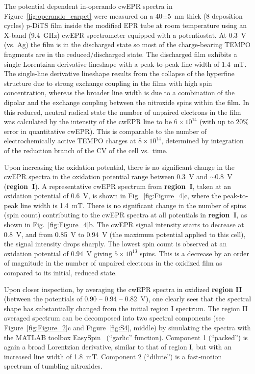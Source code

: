 The potential dependent in-operando cwEPR spectra in Figure~\ref{fig:operando_carpet} were measured on a 40$\pm$5~nm thick (8 deposition cycles) p-DiTS film inside the modified EPR tube at room temperature using an X-band (9.4~GHz) cwEPR spectrometer equipped with a potentiostat. At 0.3~V (vs. Ag) the film is in the discharged state so most of the charge-bearing TEMPO fragments are in the reduced/discharged state. The discharged film exhibits a single Lorentzian derivative lineshape with a peak-to-peak line width of 1.4~mT. The single-line derivative lineshape results from the collapse of the hyperfine structure due to strong exchange coupling in the films with high spin concentration, whereas the broader line width is due to a combination of the dipolar and the exchange coupling between the nitroxide spins within the film. In this reduced, neutral radical state the number of unpaired electrons in the film was calculated by the intensity of the cwEPR line to be $6\times10^{14}$ (with up to 20\% error in quantitative cwEPR). This is comparable to the number of electrochemically active TEMPO charges at $8\times10^{14}$, determined by integration of the reduction branch of the CV of the cell vs.\ time.
\par
Upon increasing the oxidation potential, there is no significant change in the cwEPR spectra in the oxidation potential range between 0.3~V and $\sim$0.8~V (\textbf{region~I}). A representative cwEPR spectrum from \textbf{region~I}, taken at an oxidation potential of 0.6~V, is shown in Fig.~\ref{fig:Figure_4}c, where the peak-to-peak line width is 1.4~mT. There is no significant change in the number of spins (spin count) contributing to the cwEPR spectra at all potentials in \textbf{region~I}, as shown in Fig.~\ref{fig:Figure_4}b. The cwEPR signal intensity starts to decrease at 0.8~V, and from 0.85~V to 0.94~V (the maximum potential applied to this cell), the signal intensity drops sharply. The lowest spin count is observed at an oxidation potential of 0.94~V giving $5\times10^{13}$ spins. This is a decrease by an order of magnitude in the number of unpaired electrons in the oxidized film as compared to its initial, reduced state.


\par
Upon closer inspection, by averaging the cwEPR spectra in oxidized \textbf{region II} (between the potentials of 0.90 -- 0.94 -- 0.82~V), one clearly sees that the spectral shape has substantially changed from the initial region I spectrum. The region II averaged spectrum can be decomposed into two spectral components (see Figure~\ref{fig:Figure_2}c and Figure~\ref{fig:S4}, middle) by simulating the spectra with the MATLAB toolbox EasySpin~\cite{Stoll2006} (``garlic'' function). Component 1 (``packed'') is again a broad Lorentzian derivative, similar to that of region I, but with an increased line width of 1.8~mT. Component 2 (``dilute'') is a fast-motion spectrum of tumbling nitroxides.

